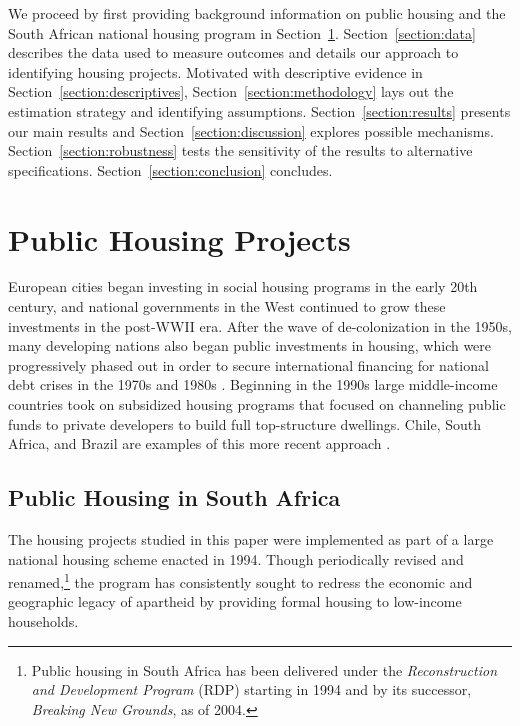 \documentclass[12pt]{article}
\begin{document}
We proceed by first providing background information on public housing and the South African national housing program in Section~\ref{section:background}.  Section~\ref{section:data} describes the data used to measure outcomes and details our approach to identifying housing projects. Motivated with descriptive evidence in Section~\ref{section:descriptives}, Section~\ref{section:methodology} lays out the estimation strategy and identifying assumptions. Section~\ref{section:results} presents our main results and Section~\ref{section:discussion} explores possible mechanisms.  Section~\ref{section:robustness} tests the sensitivity of the results to alternative specifications.  Section~\ref{section:conclusion} concludes.




\section{Public Housing Projects}\label{section:background}


European cities began investing in social housing programs in the early 20th century, and national governments in the West continued to grow these investments in the post-WWII era. After the wave of de-colonization in the 1950s, many developing nations also began public investments in housing, which were progressively phased out in order to secure international financing for national debt crises in the 1970s and 1980s \citep{rondinelli1990housing}. Beginning in the 1990s large middle-income countries took on subsidized housing programs that focused on channeling public funds to private developers to build full top-structure dwellings. Chile, South Africa, and Brazil are examples of this more recent approach \citep{buckley2005housing}.


\subsection{Public Housing in South Africa}


The housing projects studied in this paper were implemented as part of a large national housing scheme enacted in 1994. Though periodically revised and renamed,\footnote{Public housing in South Africa has been delivered under the {\it Reconstruction and Development Program} (RDP) starting in 1994 and  by its successor, {\it Breaking New Grounds}, as of 2004.} the program has consistently sought to redress the economic and geographic legacy of apartheid by providing formal housing to low-income households.  
\end{document}
